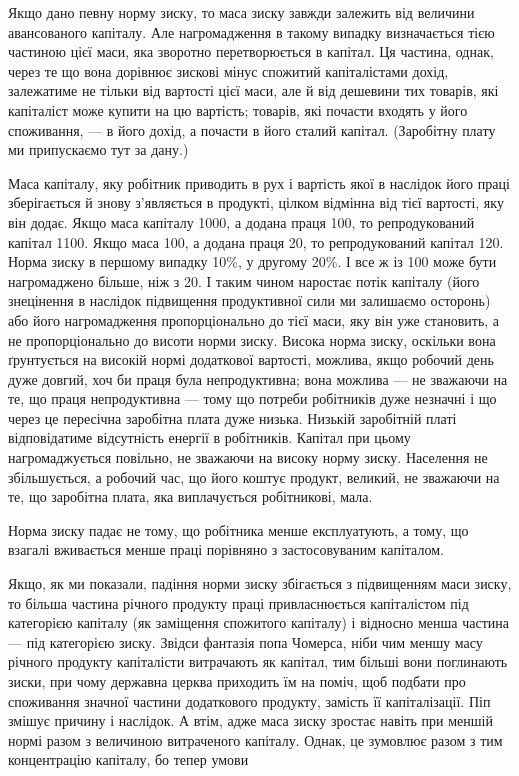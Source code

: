 
Якщо дано певну норму зиску, то маса зиску завжди залежить
від величини авансованого капіталу. Але нагромадження
в такому випадку визначається тією частиною цієї маси, яка
зворотно перетворюється в капітал. Ця частина, однак, через
те що вона дорівнює зискові мінус спожитий капіталістами дохід,
залежатиме не тільки від вартості цієї маси, але й від дешевини
тих товарів, які капіталіст може купити на цю вартість;
товарів, які почасти входять у його споживання, — в його дохід,
а почасти в його сталий капітал. (Заробітну плату ми припускаємо
тут за дану.)

Маса капіталу, яку робітник приводить в рух і вартість якої
в наслідок його праці зберігається й знову з’являється в продукті,
цілком відмінна від тієї вартості, яку він додає. Якщо
маса капіталу \deq{} 1000, а додана праця \deq{} 100, то репродукований
капітал \deq{} 1100. Якщо маса \deq{} 100, а додана праця \deq{} 20, то
репродукований капітал \deq{} 120. Норма зиску в першому випадку
\deq{} 10\%, у другому \deq{} 20\%. І все ж із 100 може бути
нагромаджено більше, ніж з 20. І таким чином наростає потік
капіталу (його знецінення в наслідок підвищення продуктивної
сили ми залишаємо осторонь) або його нагромадження
пропорціонально до тієї маси, яку він уже становить, а не
пропорціонально до висоти норми зиску. Висока норма зиску,
оскільки вона ґрунтується на високій нормі додаткової вартості,
можлива, якщо робочий день дуже довгий, хоч би
праця була непродуктивна; вона можлива — не зважаючи на
те, що праця непродуктивна — тому що потреби робітників
дуже незначні і що через це пересічна заробітна плата дуже
низька. Низькій заробітній платі відповідатиме відсутність енергії
в робітників. Капітал при цьому нагромаджується повільно,
не зважаючи на високу норму зиску. Населення не збільшується,
а робочий час, що його коштує продукт, великий, не зважаючи
на те, що заробітна плата, яка виплачується робітникові,
мала.

Норма зиску падає не тому, що робітника менше експлуатують,
а тому, що взагалі вживається менше праці порівняно
з застосовуваним капіталом.

Якщо, як ми показали, падіння норми зиску збігається з підвищенням
маси зиску, то більша частина річного продукту праці
привласнюється капіталістом під категорією капіталу (як заміщення
спожитого капіталу) і відносно менша частина — під категорією
зиску. Звідси фантазія попа Чомерса, ніби чим меншу масу річного
продукту капіталісти витрачають як капітал, тим більші
вони поглинають зиски, при чому державна церква приходить
їм на поміч, щоб подбати про споживання значної частини додаткового
продукту, замість її капіталізації. Піп змішує причину
і наслідок. А втім, адже маса зиску зростає навіть при меншій
нормі разом з величиною витраченого капіталу. Однак, це зумовлює
разом з тим концентрацію капіталу, бо тепер умови
\parbreak{}  %
